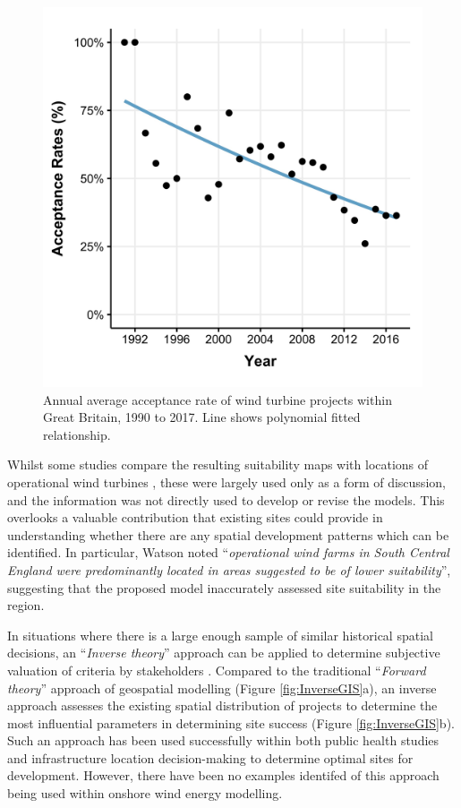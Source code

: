 \documentclass[a4paper,]{article}
\theoremstyle{definition}
\theoremstyle{definition}
\theoremstyle{definition}
\theoremstyle{remark}
\begin{document}
\begin{figure}[h]

{\centering \includegraphics[width=0.5\linewidth]{figures/figure3} 

}

\caption{Annual average acceptance rate of wind turbine projects within Great Britain, 1990 to 2017. Line shows polynomial fitted relationship.}\label{fig:acceptanceRatesWind}
\end{figure}

Whilst some studies compare the resulting suitability maps with locations of operational wind turbines \citetext{\citealp{Watson2015}; \citealp{Miller2014}; \citealp[;][]{Gass2013}; \citealp{VanHaaren2011}; \citealp{Aydin2010}}, these were largely used only as a form of discussion, and the information was not directly used to develop or revise the models. This overlooks a valuable contribution that existing sites could provide in understanding whether there are any spatial development patterns which can be identified. In particular, Watson \citeyearpar{Watson2015} noted ``\emph{operational wind farms in South Central England were predominantly located in areas suggested to be of lower suitability}'', suggesting that the proposed model inaccurately assessed site suitability in the region.

In situations where there is a large enough sample of similar historical spatial decisions, an ``\emph{Inverse theory}'' approach can be applied to determine subjective valuation of criteria by stakeholders \citep{Cirucci2014}. Compared to the traditional ``\emph{Forward theory}'' approach of geospatial modelling (Figure \ref{fig:InverseGIS}a), an inverse approach assesses the existing spatial distribution of projects to determine the most influential parameters in determining site success (Figure \ref{fig:InverseGIS}b). Such an approach has been used successfully within both public health studies \citep{Brody2002, Mohamed2004, Yamada2009, Garcia-Ayllon2013} and infrastructure location decision-making \citep{USEPA2002, Cirucci2015} to determine optimal sites for development. However, there have been no examples identifed of this approach being used within onshore wind energy modelling.
\end{document}
